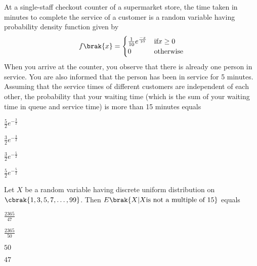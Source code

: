 \iffalse
\chapter{2024}
\author{AI24BTECH11014}
\section{st}
\fi


\item At a single-staff checkout counter of a supermarket store, the time taken in minutes to complete the service of a customer is a random variable having probability density function given by
\begin{align}
f\brak{x} = 
\begin{cases}
    \frac{1}{10} e^{\frac{-x}{10}}  & \text{if} x \geq 0 \\
    0 & \text{otherwise}
\end{cases}
\end{align}
When you arrive at the counter, you observe that there is already one person in service. You are also informed that the person has been in service for 5 minutes. Assuming that the service times of different customers are independent of each other, the probability that your waiting time (which is the sum of your waiting time in queue and service time) is more than 15 minutes equals
\begin{enumerate}
\begin{multicols}{4}
\item $\frac{5}{2} e^{-\frac{3}{2}}$
\item $\frac{3}{2} e^{-\frac{3}{2}}$
\item $\frac{3}{2} e^{-\frac{5}{2}}$
\item $\frac{5}{2} e^{-\frac{5}{2}}$
\end{multicols}
\end{enumerate}

\item Let $X$ be a random variable having discrete uniform distribution on $\cbrak{1, 3, 5, 7, \dots, 99}$. Then $E\brak{X | X \text{is not a multiple of 15}} $ equals
\begin{enumerate}
\begin{multicols}{4}
\item $\frac{2365}{47}$
\item $\frac{2365}{50}$
\item $50$
\item $47$
\end{multicols}
\end{enumerate}


